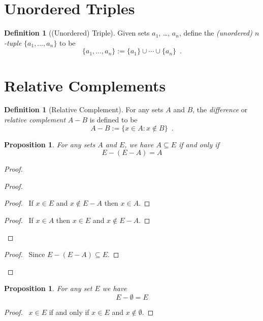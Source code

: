 \documentclass{report}
\let\qed\relax
\newtheorem{prop}[ax]{Proposition}
\theoremstyle{definition}
\newtheorem{df}[ax]{Definition}
\begin{document}
\section{Unordered Triples}

\begin{df}[(Unordered) Triple]
Given sets $a_1$, \ldots, $a_n$, define the \emph{(unordered) $n$-tuple} $\{a_1, \ldots, a_n\}$ to be
\[ \{a_1, \ldots, a_n\} := \{a_1\} \cup \cdots \cup \{a_n\} \enspace . \]
\end{df}

\section{Relative Complements}

\begin{df}[Relative Complement]
For any sets $A$ and $B$, the \emph{difference} or \emph{relative complement} $A - B$ is defined to be
\[ A - B := \{ x \in A : x \notin B \} \enspace . \]
\end{df}

\begin{prop}
For any sets $A$ and $E$, we have $A \subseteq E$ if and only if
\[ E - (E - A) = A \]
\end{prop}

\begin{proof}
\pf
{}
\begin{proof}
	\begin{proof}
		\pf\ If $x \in E$ and $x \notin E - A$ then $x \in A$.
	\end{proof}
	\begin{proof}
		\pf\ If $x \in A$ then $x \in E$ and $x \notin E - A$.
	\end{proof}
\end{proof}
\begin{proof}
	\pf\ Since $E - (E - A) \subseteq E$.
\end{proof}
\qed
\end{proof}

\begin{prop}
For any set $E$ we have
\[ E - \emptyset = E \]
\end{prop}

\begin{proof}
\pf\ $x \in E$ if and only if $x \in E$ and $x \notin \emptyset$. \qed
\end{proof}
\end{document}
